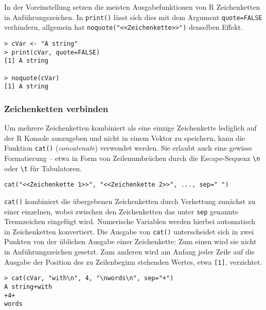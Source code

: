 In der Voreinstellung setzen die meisten Ausgabefunktionen von R Zeichenketten in Anführungszeichen. In \lstinline!print()! lässt sich dies mit dem Argument \lstinline!quote=FALSE! verhindern, allgemein hat  \lstinline!noquote("<<Zeichenkette>>")! denselben Effekt.
\begin{lstlisting}
> cVar <- "A string"
> print(cVar, quote=FALSE)
[1] A string

> noquote(cVar)
[1] A string
\end{lstlisting}

\subsubsection{Zeichenketten verbinden}

Um mehrere Zeichenketten kombiniert als eine einzige Zeichenkette lediglich auf der R Konsole auszugeben und nicht in einem Vektor zu speichern, kann die Funktion \lstinline!cat()! (\emph{concatenate}) verwendet werden. Sie erlaubt auch eine gewisse Formatierung -- etwa in Form von Zeilenumbrüchen durch die\index[func]{\textbackslash@\texttt{\textbackslash}} Escape-Sequenz \lstinline!\n! oder \lstinline!\t! für Tabulatoren.
\begin{lstlisting}
cat("<<Zeichenkette 1>>", "<<Zeichenkette 2>>", ..., sep=" ")
\end{lstlisting}

\lstinline!cat()! kombiniert die übergebenen Zeichenketten durch Verkettung zunächst zu einer einzelnen, wobei zwischen den Zeichenketten das unter \lstinline!sep! genannte Trennzeichen eingefügt wird. Numerische Variablen werden hierbei automatisch in Zeichenketten konvertiert. Die Ausgabe von \lstinline!cat()! unterscheidet sich in zwei Punkten von der üblichen Ausgabe einer Zeichenkette: Zum einen wird sie nicht in Anführungszeichen gesetzt. Zum anderen wird am Anfang jeder Zeile auf die Ausgabe der Position des zu Zeilenbeginn stehenden Wertes, etwa \lstinline![1]!, verzichtet.
\begin{lstlisting}
> cat(cVar, "with\n", 4, "\nwords\n", sep="+")
A string+with
+4+
words
\end{lstlisting}

